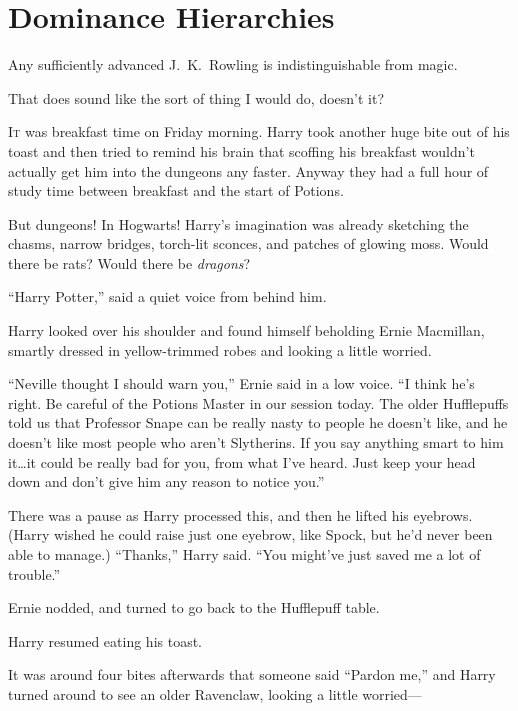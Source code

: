 \chapter{Dominance Hierarchies}

\begin{chapterOpeningAuthorNote}
Any sufficiently advanced J.~K.~Rowling is indistinguishable from magic.
\end{chapterOpeningAuthorNote}
\begin{chapterOpeningQuote}
That does sound like the sort of thing I would do, doesn't it?
\end{chapterOpeningQuote}

\lettrine{I}{t} was breakfast time on Friday morning. Harry took another huge bite out of his toast and then tried to remind his brain that scoffing his breakfast wouldn’t actually get him into the dungeons any faster. Anyway they had a full hour of study time between breakfast and the start of Potions.

But dungeons! In Hogwarts! Harry’s imagination was already sketching the chasms, narrow bridges, torch-lit sconces, and patches of glowing moss. Would there be rats? Would there be \emph{dragons}?

“Harry Potter,” said a quiet voice from behind him.

Harry looked over his shoulder and found himself beholding Ernie Macmillan, smartly dressed in yellow-trimmed robes and looking a little worried.

“Neville thought I should warn you,” Ernie said in a low voice. “I think he’s right. Be careful of the Potions Master in our session today. The older Hufflepuffs told us that Professor Snape can be really nasty to people he doesn’t like, and he doesn’t like most people who aren’t Slytherins. If you say anything smart to him it…it could be really bad for you, from what I’ve heard. Just keep your head down and don’t give him any reason to notice you.”

There was a pause as Harry processed this, and then he lifted his eyebrows. (Harry wished he could raise just one eyebrow, like Spock, but he’d never been able to manage.) “Thanks,” Harry said. “You might’ve just saved me a lot of trouble.”

Ernie nodded, and turned to go back to the Hufflepuff table.

Harry resumed eating his toast.

It was around four bites afterwards that someone said “Pardon me,” and Harry turned around to see an older Ravenclaw, looking a little worried—

